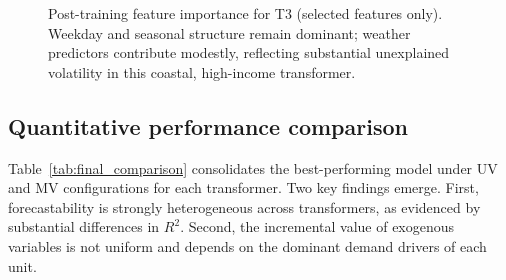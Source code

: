 \begin{figure}[t]
\centering
\begin{subfigure}[t]{0.32\textwidth}
    \centering
    
\end{subfigure}
\begin{subfigure}[t]{0.32\textwidth}
    \centering
    
\end{subfigure}
\begin{subfigure}[t]{0.32\textwidth}
    \centering
    
\end{subfigure}
\caption{Post-training feature importance for T3 (selected features only). Weekday and seasonal structure remain dominant; weather predictors contribute modestly, reflecting substantial unexplained volatility in this coastal, high-income transformer.}
\label{fig:importance_T70a}
\end{figure}

\subsection{Quantitative performance comparison}
\label{subsec:results_quantitative}

Table~\ref{tab:final_comparison} consolidates the best-performing model under UV and MV configurations for each transformer. Two key findings emerge. First, forecastability is strongly heterogeneous across transformers, as evidenced by substantial differences in $R^2$. Second, the incremental value of exogenous variables is not uniform and depends on the dominant demand drivers of each unit.

